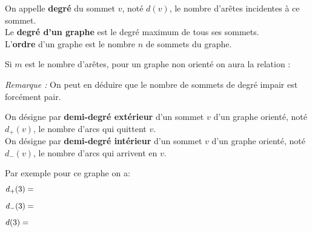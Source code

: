 \begin{defi}
On appelle \textbf{degré} du sommet $v$, noté $d(v)$, le nombre d'arêtes incidentes à ce sommet.\\
Le \textbf{degré d'un graphe} est le degré maximum de tous ses sommets.\\
L'\textbf{ordre} d'un graphe est le nombre $n$ de sommets du graphe.
\end{defi}

Si $m$ est le nombre d'arêtes, pour un graphe non orienté on aura la relation :


\textit{Remarque :} On peut en déduire que le nombre de sommets de degré impair est forcément pair.

\smallskip
On désigne par \textbf{demi-degré extérieur} d'un sommet $v$ d'un graphe orienté, noté $d_+(v)$, le nombre d'arcs qui quittent $v$.\\
On désigne par \textbf{demi-degré intérieur} d'un sommet $v$ d'un graphe orienté, noté $d_-(v)$, le nombre d'arcs qui arrivent en $v$.\\
 

\begin{minipage}[l]{0.5\linewidth}
\begin{center}
\end{center}
\end{minipage}
\begin{minipage}[l]{0.5\linewidth}
Par exemple pour ce graphe on a: 
$$d_+(3) = \Cache{3}$$
$$d_-(3) = \Cache{1} $$
$$d(3)= \Cache{4}$$
\end{minipage}

\vspace{0.3cm}

